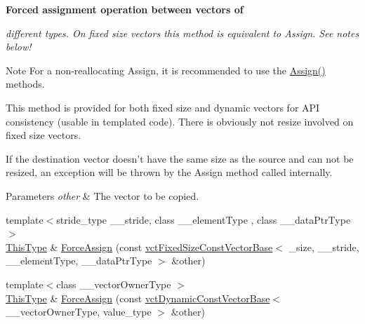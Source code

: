 \begin{Indent}{\bf Forced assignment operation between vectors of}\par
{\em different types. On fixed size vectors this method is equivalent to Assign. See notes below!

\begin{DoxyNote}{Note}
For a non-\/reallocating Assign, it is recommended to use the \hyperlink{classvct_fixed_size_vector_base_a0bfbc67194bcb1aa6b614524df8d1fa1}{Assign()} methods.

This method is provided for both fixed size and dynamic vectors for A\-P\-I consistency (usable in templated code). There is obviously not resize involved on fixed size vectors.

If the destination vector doesn't have the same size as the source and can not be resized, an exception will be thrown by the Assign method called internally.
\end{DoxyNote}

\begin{DoxyParams}{Parameters}
{\em other} & The vector to be copied. \\
\hline
\end{DoxyParams}
}\begin{DoxyCompactItemize}
\item 
{\footnotesize template$<$stride\-\_\-type \-\_\-\-\_\-stride, class \-\_\-\-\_\-element\-Type , class \-\_\-\-\_\-data\-Ptr\-Type $>$ }\\\hyperlink{classvct_fixed_size_const_vector_base_a071063bc4fa43112cc287b2dbef53180}{This\-Type} \& \hyperlink{classvct_fixed_size_vector_base_a27268af4d9808d33446164107bc18d0a}{Force\-Assign} (const \hyperlink{classvct_fixed_size_const_vector_base}{vct\-Fixed\-Size\-Const\-Vector\-Base}$<$ \-\_\-size, \-\_\-\-\_\-stride, \-\_\-\-\_\-element\-Type, \-\_\-\-\_\-data\-Ptr\-Type $>$ \&other)
\item 
{\footnotesize template$<$class \-\_\-\-\_\-vector\-Owner\-Type $>$ }\\\hyperlink{classvct_fixed_size_const_vector_base_a071063bc4fa43112cc287b2dbef53180}{This\-Type} \& \hyperlink{classvct_fixed_size_vector_base_a2d4938c4dfd8f40e12cba75d58fbe816}{Force\-Assign} (const \hyperlink{classvct_dynamic_const_vector_base}{vct\-Dynamic\-Const\-Vector\-Base}$<$ \-\_\-\-\_\-vector\-Owner\-Type, value\-\_\-type $>$ \&other)
\end{DoxyCompactItemize}
\end{Indent}
{\bf }\par
